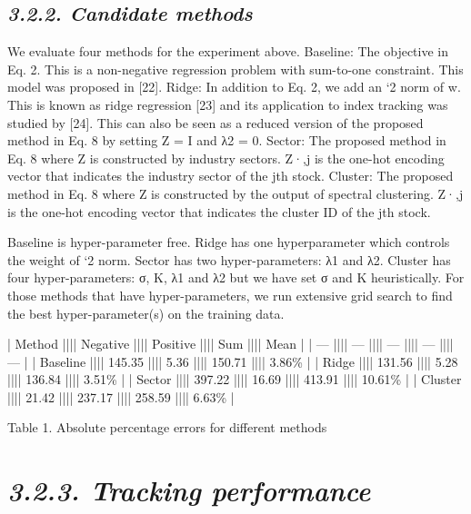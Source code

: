 \documentclass{article}
\begin{document}
\subsection{\textit{3.2.2. Candidate methods}}

We evaluate four methods for the experiment above. Baseline: The objective in Eq. 2. This is a non-negative regression problem with sum-to-one constraint. This model was proposed in [22]. Ridge: In addition to Eq. 2, we add an `2 norm of w. This is known as ridge regression [23] and its application to index tracking was studied by [24]. This can also be seen as a reduced version of the proposed method in Eq. 8 by setting Z = I and λ2 = 0. Sector: The proposed method in Eq. 8 where Z is constructed by industry sectors. Z·,j is the one-hot encoding vector that indicates the industry sector of the jth stock. Cluster: The proposed method in Eq. 8 where Z is constructed by the output of spectral clustering. Z·,j is the one-hot encoding vector that indicates the cluster ID of the jth stock.

Baseline is hyper-parameter free. Ridge has one hyperparameter which controls the weight of `2 norm. Sector has two hyper-parameters: λ1 and λ2. Cluster has four hyper-parameters: σ, K, λ1 and λ2 but we have set σ and K heuristically. For those methods that have hyper-parameters, we run extensive grid search to find the best hyper-parameter(s) on the training data.

| Method   |||| Negative |||| Positive |||| Sum    |||| Mean   |
| ---      |||| ---      |||| ---      |||| ---    |||| ---    |
| Baseline |||| 145.35   |||| 5.36     |||| 150.71 |||| 3.86\%  |
| Ridge    |||| 131.56   |||| 5.28     |||| 136.84 |||| 3.51\%  |
| Sector   |||| 397.22   |||| 16.69    |||| 413.91 |||| 10.61\% |
| Cluster  |||| 21.42    |||| 237.17   |||| 258.59 |||| 6.63\%  |

Table 1. Absolute percentage errors for different methods

\section{\textit{3.2.3. Tracking performance}}
\end{document}
